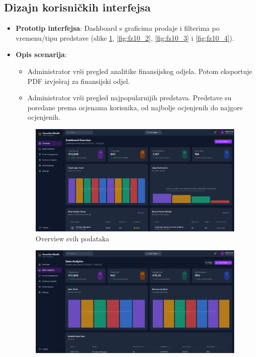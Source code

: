 \subsection{Dizajn korisničkih interfejsa}  
\begin{itemize}  
    \item \textbf{Prototip interfejsa}: Dashboard s graficima prodaje i filterima po vremenu/tipu predstave (slike \ref{fig:fz10_1}, \ref{fig:fz10_2}, \ref{fig:fz10_3} i \ref{fig:fz10_4}).  
    \item \textbf{Opis scenarija}:  
        \begin{itemize}  
            \item Administrator vrši pregled analitike finansijskog odjela. Potom eksportuje PDF izvješraj za finansijski odjel.   
            \item Administrator vrši pregled najpopularnijih predstava. Predstave su poredane prema ocjenama korisnika, od najbolje ocjenjenih do najgore ocjenjenih.  
        \end{itemize} 
    \begin{figure}[H]
        \centering
        \includegraphics[width=1\linewidth]{Slike/FZ10/fz10_1.png}
        \caption{Overview svih podataka}
        \label{fig:fz10_1}
    \end{figure}
    \begin{figure}[H]
        \centering
        \includegraphics[width=1\linewidth]{Slike/FZ10/fz10_2.png}

\end{figure}
\end{itemize}
